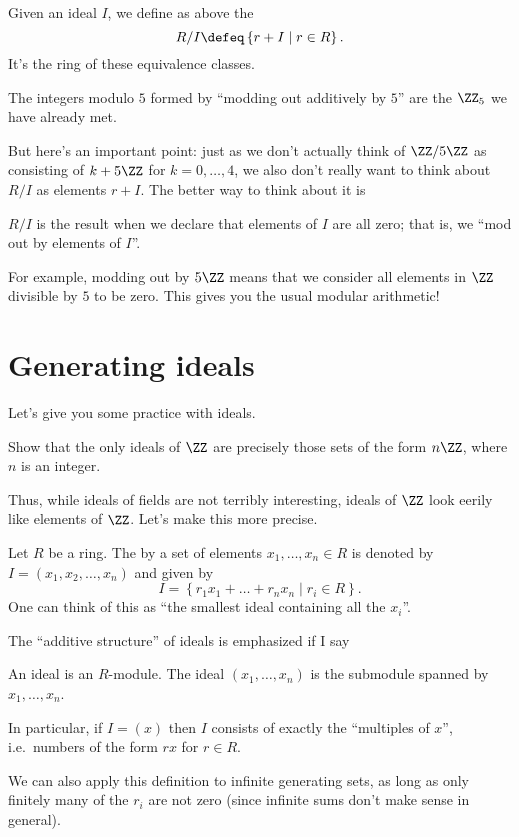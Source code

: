 \begin{definition}
	Given an ideal $I$, we define as above the 
	\[ R/I \defeq \left\{ r+I \mid r \in R \right\}. \]
	It's the ring of these equivalence classes.
\end{definition}
\begin{example}[$\ZZ/5\ZZ$]
	The integers modulo $5$ formed by ``modding out additively by $5$''
	are the $\Zc 5$ we have already met.
\end{example}
But here's an important point:
just as we don't actually think of $\ZZ/5\ZZ$ as consisting of
$k + 5\ZZ$ for $k=0,\dots,4$,
we also don't really want to think about $R/I$ as elements $r+I$.
The better way to think about it is
\begin{moral}
	$R/I$ is the result when we declare that elements of $I$ are all zero;
	that is, we ``mod out by elements of $I$''.
\end{moral}
For example, modding out by $5\ZZ$ means that we consider
all elements in $\ZZ$ divisible by $5$ to be zero.
This gives you the usual modular arithmetic!


\section{Generating ideals}
Let's give you some practice with ideals.

\begin{exercise}
	Show that the only ideals of $\ZZ$ are precisely those
	sets of the form $n\ZZ$, where $n$ is an integer.
\end{exercise}

Thus, while ideals of fields are not terribly interesting,
ideals of $\ZZ$ look eerily like elements of $\ZZ$.
Let's make this more precise.
\begin{definition}
	Let $R$ be a ring.
	The  by a set of elements $x_1, \dots, x_n \in R$
	is denoted by $I = (x_1, x_2, \dots, x_n)$
	and given by
	\[
		I = \left\{ r_1x_1 + \dots + r_nx_n \mid r_i \in R \right\}.
	\]
	One can think of this as ``the smallest ideal containing all the $x_i$''.
\end{definition}
The ``additive structure'' of ideals is emphasized if I say
\begin{moral}
	An ideal is an $R$-module.
	The ideal $(x_1, \dots, x_n)$ is the submodule
	spanned by $x_1, \dots, x_n$.
\end{moral}
In particular, if $I = (x)$ then $I$ consists of exactly the
``multiples of $x$'', i.e.\ numbers of the form $rx$ for $r \in R$.
\begin{remark}
	We can also apply this definition to infinite generating sets, as long as
	only finitely many of the $r_i$ are not zero (since infinite sums
	don't make sense in general).
\end{remark}

